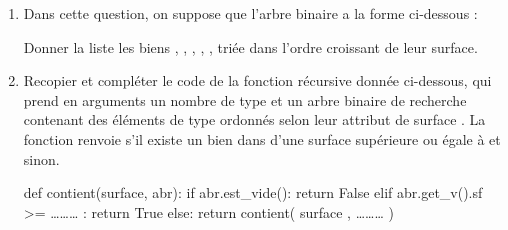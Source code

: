 \documentclass[11pt,a4paper,french,twoside]{PMCours}
\begin{document}
\begin{enumerate}
\begin{enumerate}
\item Dans cette question, on suppose que l'arbre binaire  a la forme ci-dessous :
\begin{center}
\end{center}
Donner la liste les biens , , , , ,  triée dans l'ordre croissant de leur surface.
\item Recopier et compléter le code de la fonction récursive  donnée ci-dessous, qui
prend en arguments un nombre  de type  et un arbre binaire de recherche
 contenant des éléments de type  ordonnés selon leur attribut de surface . La
fonction  renvoie  s'il existe un bien dans  d'une
surface supérieure ou égale à  et  sinon.
\begin{Python*}
def contient(surface, abr):
    if abr.est_vide():
        return False
    elif abr.get_v().sf >= ……… :
        return True 
    else:
        return contient( surface , ……… ) 
\end{Python*}
\end{enumerate}
\end{enumerate}
\end{document}
